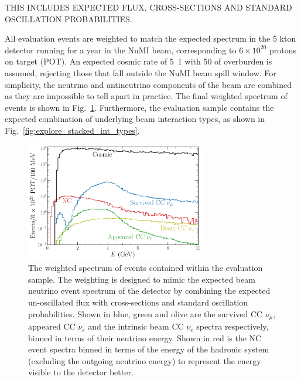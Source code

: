 THIS INCLUDES EXPECTED FLUX, CROSS-SECTIONS AND STANDARD OSCILLATION PROBABILITIES.

All evaluation events are weighted to match the expected spectrum in the 5 kton \chipsfive
detector running for a year in the NuMI beam, corresponding to $6\times 10^{20}$ protons on target
(POT). An expected cosmic rate of \unit{5.1}{} with \unit{50}{} of
overburden is assumed, rejecting those that fall outside the NuMI beam spill window. For
simplicity, the neutrino and antineutrino components of the beam are combined as they are
impossible to tell apart in practice. The final weighted spectrum of events is shown in
Fig.~\ref{fig:explore_osc_fluxes}. Furthermore, the evaluation sample contains the expected
combination of underlying beam interaction types, as shown in
Fig.~\ref{fig:explore_stacked_int_types}.

\begin{figure} %
    \includegraphics[width=0.7\textwidth]{diagrams/6-cvn/chipsnet/explore_osc_fluxes.pdf}
    \caption[Weighted spectrum of evaluation sample events.]
    {The weighted spectrum of events contained within the evaluation sample. The weighting is
        designed to mimic the expected beam neutrino event spectrum of the \chips detector by
        combining the expected un-oscillated flux with cross-sections and standard oscillation
        probabilities. Shown in blue, green and olive are the survived CC $\nu_{\mu}$, appeared CC
        $\nu_{e}$ and the intrinsic beam CC $\nu_{e}$ spectra respectively, binned in terms of
        their neutrino energy. Shown in red is the NC event spectra binned in terms of the energy
        of the hadronic system (excluding the outgoing neutrino energy) to represent the energy
        visible to the detector better.}
    \label{fig:explore_osc_fluxes}
\end{figure}

